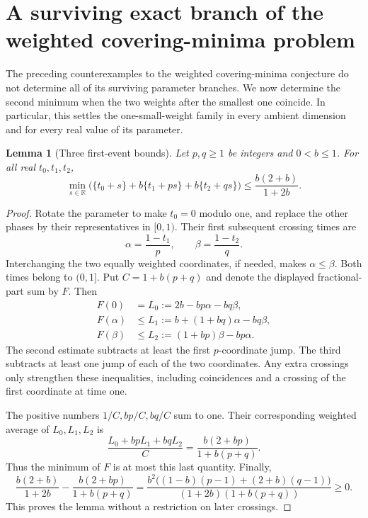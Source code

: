 \documentclass[11pt,a4paper]{article}
\newtheorem{lemma}[theorem]{Lemma}
\theoremstyle{remark}\newtheorem{remark}[theorem]{Remark}
\begin{document}
\section{A surviving exact branch of the weighted covering-minima problem}
\label{r4w:sec-one-small}

The preceding counterexamples to the weighted covering-minima conjecture
do not determine all of its surviving parameter branches. We now determine
the second minimum when the two weights after the smallest one coincide.
In particular, this settles the one-small-weight family in every ambient
dimension and for every real value of its parameter.

\begin{lemma}[Three first-event bounds]
\label{r4w:lem-first-events}
Let $p,q\ge1$ be integers and $0<b\le1$. For all real $t_0,t_1,t_2$,
\[
 \min_{s\in\mathbb R}
 \bigl(\{t_0+s\}+b\{t_1+ps\}+b\{t_2+qs\}\bigr)
 \le \frac{b(2+b)}{1+2b}.
\]
\end{lemma}
\begin{proof}
Rotate the parameter to make $t_0=0$ modulo one, and replace the other
phases by their representatives in $[0,1)$. Their first subsequent
crossing times are
\[
 \alpha=\frac{1-t_1}{p},\qquad
 \beta=\frac{1-t_2}{q}.
\]
Interchanging the two equally weighted coordinates, if needed, makes
$\alpha\le\beta$. Both times belong to $(0,1]$. Put
$C=1+b(p+q)$ and denote the displayed fractional-part sum by $F$.
Then
\begin{align*}
 F(0)&=L_0:=2b-bp\alpha-bq\beta,\\
 F(\alpha)&\le L_1:=b+(1+bq)\alpha-bq\beta,\\
 F(\beta)&\le L_2:=(1+bp)\beta-bp\alpha.
\end{align*}
The second estimate subtracts at least the first $p$-coordinate jump.
The third subtracts at least one jump of each of the two coordinates.
Any extra crossings only strengthen these inequalities, including
coincidences and a crossing of the first coordinate at time one.

The positive numbers $1/C,bp/C,bq/C$ sum to one. Their corresponding
weighted average of $L_0,L_1,L_2$ is
\[
 \frac{L_0+bpL_1+bqL_2}{C}
 =\frac{b(2+bp)}{1+b(p+q)}.
\]
Thus the minimum of $F$ is at most this last quantity. Finally,
\[
 \frac{b(2+b)}{1+2b}
 -\frac{b(2+bp)}{1+b(p+q)}
 =\frac{b^2\bigl((1-b)(p-1)+(2+b)(q-1)\bigr)}
 {(1+2b)(1+b(p+q))}\ge0.
\]
This proves the lemma without a restriction on later crossings.
\end{proof}
\end{document}
